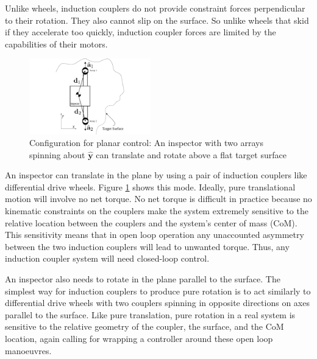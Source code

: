 \documentclass[letterpaper, 10 pt, conference]{ieeeconf}  %
\newcommand{\matt}[1]{{\color{darkgreen}\small\par {[{\bf Matt says:} {\em #1}} ] \\    }}
\begin{document}
Unlike wheels, induction couplers do not provide constraint forces perpendicular to their rotation.  
They also cannot slip on the surface. So unlike wheels that skid if they accelerate too quickly, induction coupler forces are limited by the capabilities of their motors.

%

 
   \begin{figure}[thpb]
      \centering
      \includegraphics[width = 0.47\textwidth]{figures/surface_locomotion.pdf}
      \caption{Configuration for planar control: An inspector with two arrays spinning about $\hat{\textbf{y}}$ can translate and rotate above a flat target surface}
      \label{fig:planarsetup}
   \end{figure}

 \par An inspector can translate in the plane by using a pair of induction couplers like differential drive wheels. Figure \ref{fig:planarsetup} shows this mode. Ideally, pure translational motion will involve no net torque. No net torque is difficult in practice because no kinematic constraints on the couplers make the system extremely sensitive to the relative location between the couplers and the system's center of mass (CoM)\label{def:com}. This sensitivity means that in open loop operation any unaccounted asymmetry between the two induction couplers will lead to unwanted torque. Thus, any induction coupler system will need closed-loop control. 
      
\par An inspector also needs to rotate in the plane parallel to the surface. The simplest way for induction couplers to produce pure rotation is to act similarly to differential drive wheels with two couplers spinning in opposite directions on axes parallel to the surface. Like pure translation, pure rotation in a real system is sensitive to the relative geometry of the coupler, the surface, and the CoM location, again calling for wrapping a controller around these open loop manoeuvres.  
\end{document}
